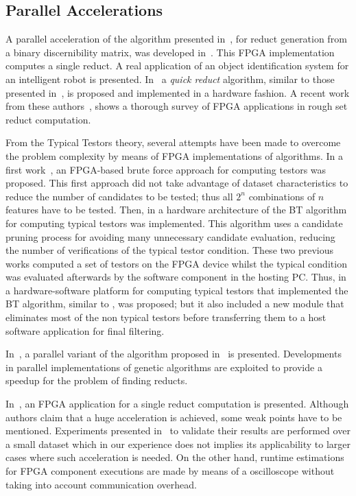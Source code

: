 \documentclass[authoryear,11pt]{elsarticle}
\begin{document}
\subsection{Parallel Accelerations}

  A parallel acceleration of the algorithm presented in~\citep{Yang08}, for reduct generation from a binary
  discernibility matrix, was developed in~\citep{Tiwari11,Tiwari12}. This FPGA implementation computes a 
  single reduct. A real application of an object identification system for an intelligent robot is presented.
  In~\citep{Tiwari13} a \emph{quick reduct} algorithm, similar to those presented in~\citep{Chouchoulas01}, 
  is proposed and implemented in a hardware fashion. A recent work from these authors~\citep{Tiwari14}, 
  shows a thorough survey of FPGA applications in rough set reduct computation.

  From the Typical Testors theory, several attempts have been made to overcome the problem 
  complexity by means of FPGA implementations of algorithms. In a first work~\citep{Cumplido06}, an 
  FPGA-based brute force approach for computing testors was proposed. This first approach did 
  not take advantage of dataset characteristics to reduce the number of candidates to be tested; 
  thus all $2^n$ combinations of $n$ features have to be tested. Then, in \citep{Rojas07} a hardware 
  architecture of the BT algorithm for computing typical testors was implemented. 
  This algorithm uses a candidate pruning process for avoiding many unnecessary candidate evaluation, 
  reducing the number of verifications of the typical testor condition. These two previous works computed 
  a set of testors on the FPGA device whilst the typical condition was evaluated afterwards by the 
  software component in the hosting PC. Thus, in~\citep{Rojas12} a hardware-software platform for 
  computing typical testors that implemented the BT algorithm, similar to \citep{Rojas07}, was proposed; 
  but it also included a new module that eliminates most of the non typical testors before transferring them to 
  a host software application for final filtering. 
	
  In~\citep{Wroblewski98}, a parallel variant of the algorithm proposed in~\citep{Wroblewski95} is presented.
  Developments in parallel implementations of genetic algorithms are exploited to provide a speedup for the 
  problem of finding reducts.
  
  In~\citep{Grzes13,Kopczynski14}, an FPGA application for a single reduct computation is presented. Although
  authors claim that a huge acceleration is achieved, some weak points have to be mentioned. Experiments presented 
  in~\citep{Kopczynski14} to validate their results are performed over a small dataset which in our experience 
  does not implies its applicability to larger cases where such acceleration is needed. On the other hand, 
  runtime estimations for FPGA component executions are made by means of a oscilloscope without taking into 
  account communication overhead.
\clearpage
\end{document}
